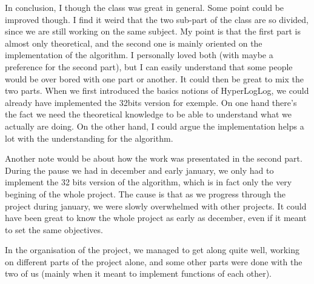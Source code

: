 \documentclass{article}
\begin{document}
 In conclusion, I though the class was great in general. Some point could be improved though. I find it weird that
 the two sub-part of the class are so divided, since we are still working on the same subject. My point is that the 
 first part is almost only theoretical, and the second one is mainly oriented on the implementation of the algorithm. 
 I personally loved both (with maybe a preference for the second part), but I can easily understand that some people 
 would be over bored with one part or another. It could then be great to mix the two parts. When we first introduced 
 the basics notions of HyperLogLog, we could already have implemented the 32bits version for exemple. 
 On one hand there's the fact we need the theoretical knowledge to be able to understand what we actually are doing.
 On the other hand, I could argue the implementation helps a lot with the understanding for the algorithm. 

 Another note would be about how the work was presentated in the second part. During the pause we had in december
 and early january, we only had to implement the 32 bits version of the algorithm, which is in fact only the very
 begining of the whole project. The cause is that as we progress through the project during january, we were slowly
 overwhelmed with other projects. It could have been great to know the whole project as early as december,
 even if it meant to set the same objectives. 

 In the organisation of the project, we managed to get along quite well, working on different parts of the project alone, and some other parts were done with the two of us (mainly when it meant to implement functions of each other).
 
\end{document}
